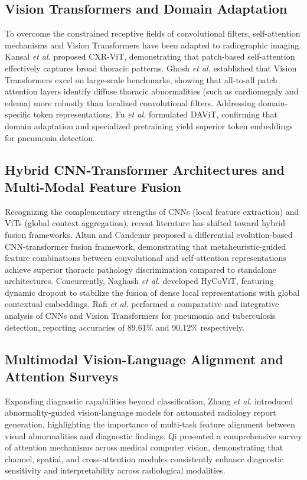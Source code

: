 \documentclass[journal]{IEEEtran}
\begin{document}
\subsection{Vision Transformers and Domain Adaptation}
To overcome the constrained receptive fields of convolutional filters, self-attention mechanisms and Vision Transformers have been adapted to radiographic imaging. Kansal \textit{et al.} \cite{kansal2025cxr} proposed CXR-ViT, demonstrating that patch-based self-attention effectively captures broad thoracic patterns. Ghosh \textit{et al.} \cite{ghosh2025vision} established that Vision Transformers excel on large-scale benchmarks, showing that all-to-all patch attention layers identify diffuse thoracic abnormalities (such as cardiomegaly and edema) more robustly than localized convolutional filters. Addressing domain-specific token representations, Fu \textit{et al.} \cite{fu2025davit} formulated DAViT, confirming that domain adaptation and specialized pretraining yield superior token embeddings for pneumonia detection.

\subsection{Hybrid CNN-Transformer Architectures and Multi-Modal Feature Fusion}
Recognizing the complementary strengths of CNNs (local feature extraction) and ViTs (global context aggregation), recent literature has shifted toward hybrid fusion frameworks. Altun and Candemir \cite{altun2026differential} proposed a differential evolution-based CNN-transformer fusion framework, demonstrating that metaheuristic-guided feature combinations between convolutional and self-attention representations achieve superior thoracic pathology discrimination compared to standalone architectures. Concurrently, Naghash \textit{et al.} \cite{naghash2025hycovit} developed HyCoViT, featuring dynamic dropout to stabilize the fusion of dense local representations with global contextual embeddings. Rafi \textit{et al.} \cite{rafi2025chest} performed a comparative and integrative analysis of CNNs and Vision Transformers for pneumonia and tuberculosis detection, reporting accuracies of 89.61\% and 90.12\% respectively.

\subsection{Multimodal Vision-Language Alignment and Attention Surveys}
Expanding diagnostic capabilities beyond classification, Zhang \textit{et al.} \cite{zhang2025abnormality} introduced abnormality-guided vision-language models for automated radiology report generation, highlighting the importance of multi-task feature alignment between visual abnormalities and diagnostic findings. Qi \cite{qi2025attention} presented a comprehensive survey of attention mechanisms across medical computer vision, demonstrating that channel, spatial, and cross-attention modules consistently enhance diagnostic sensitivity and interpretability across radiological modalities.
\end{document}

